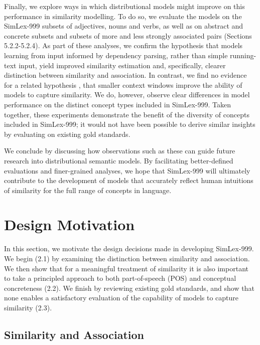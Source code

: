 Finally, we explore ways in which distributional models might improve on this performance in similarity modelling. To do so, we evaluate the models on the SimLex-999 subsets of adjectives, nouns and verbs, as well as on abstract and concrete subsets and subsets of more and less strongly associated pairs (Sections 5.2.2-5.2.4). As part of these analyses, we confirm the hypothesis \cite{agirre2009study,levy2014dependency} that models learning from input informed by dependency parsing, rather than simple running-text input, yield improved similarity estimation and, specifically, clearer distinction between similarity and association. In contrast, we find no evidence for a related hypothesis \cite{agirre2009study,kiela2014systematic}, that smaller context windows improve the ability of models to capture similarity. We do, however, observe clear differences in model performance on the distinct concept types included in SimLex-999. Taken together, these experiments demonstrate the benefit of the diversity of concepts included in SimLex-999; it would not have been possible to derive similar insights by evaluating on existing gold standards.

We conclude by discussing how observations such as these can guide future research into distributional semantic models. By facilitating better-defined evaluations and finer-grained analyses, we hope that SimLex-999 will ultimately contribute to the development of models that accurately reflect human intuitions of similarity for the full range of concepts in language. 

\section{Design Motivation}

In this section, we motivate the design decisions made in developing SimLex-999. We begin (2.1) by examining the distinction between similarity and association. We then show that for a meaningful treatment of similarity it is also important to take a principled approach to  both part-of-speech (POS) and conceptual concreteness (2.2). We finish by reviewing existing gold standards, and show that none enables a satisfactory evaluation of the capability of models to capture similarity (2.3).

\subsection{Similarity and Association}


